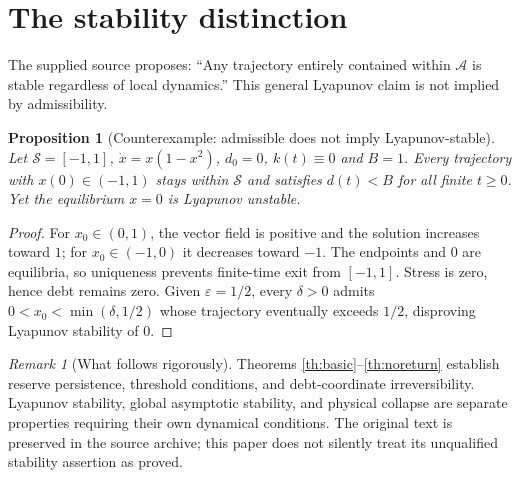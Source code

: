 \documentclass[11pt,letterpaper]{article}
\newtheorem{proposition}[theorem]{Proposition}
\theoremstyle{definition}\newtheorem{definition}[theorem]{Definition}\newtheorem{example}[theorem]{Example}
\theoremstyle{remark}\newtheorem{remark}[theorem]{Remark}
\begin{document}
\section{The stability distinction}
The supplied source proposes: ``Any trajectory entirely contained within $\mathcal A$ is stable regardless of local dynamics.'' This general Lyapunov claim is not implied by admissibility.
\begin{proposition}[Counterexample: admissible does not imply Lyapunov-stable]\label{prop:counter}
Let $\mathcal S=[-1,1]$, $\dot x=x(1-x^2)$, $d_0=0$, $k(t)\equiv0$ and $B=1$. Every trajectory with $x(0)\in(-1,1)$ stays within $\mathcal S$ and satisfies $d(t)<B$ for all finite $t\geq0$. Yet the equilibrium $x=0$ is Lyapunov unstable.
\end{proposition}
\begin{proof}
For $x_0\in(0,1)$, the vector field is positive and the solution increases toward $1$; for $x_0\in(-1,0)$ it decreases toward $-1$. The endpoints and $0$ are equilibria, so uniqueness prevents finite-time exit from $[-1,1]$. Stress is zero, hence debt remains zero. Given $\varepsilon=1/2$, every $\delta>0$ admits $0<x_0<\min(\delta,1/2)$ whose trajectory eventually exceeds $1/2$, disproving Lyapunov stability of $0$.
\end{proof}
\begin{remark}[What follows rigorously]
Theorems \ref{th:basic}--\ref{th:noreturn} establish reserve persistence, threshold conditions, and debt-coordinate irreversibility. Lyapunov stability, global asymptotic stability, and physical collapse are separate properties requiring their own dynamical conditions. The original text is preserved in the source archive; this paper does not silently treat its unqualified stability assertion as proved.
\end{remark}
\end{document}
